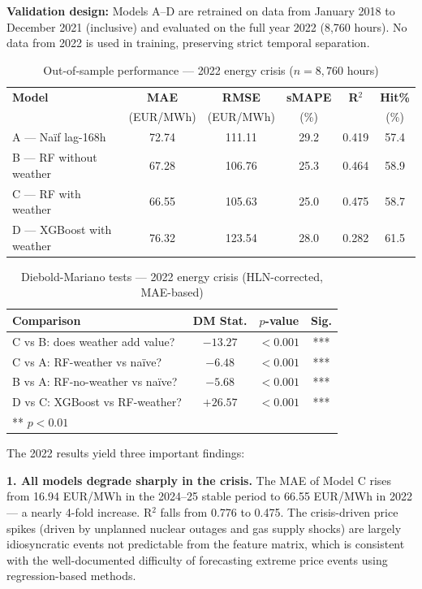 \textbf{Validation design:} Models A--D are retrained on data from January 2018
to December 2021 (inclusive) and evaluated on the full year 2022 (8{,}760
hours). No data from 2022 is used in training, preserving strict temporal
separation.

\begin{table}[H]
  \centering
  \caption{Out-of-sample performance — 2022 energy crisis ($n = 8{,}760$ hours)}
  \label{tab:model_results_2022}
  \begin{tabular}{lccccc}
    \toprule
    \textbf{Model} & \textbf{MAE} & \textbf{RMSE} & \textbf{sMAPE}
      & \textbf{R$^2$} & \textbf{Hit\%} \\
    & (EUR/MWh) & (EUR/MWh) & (\%) & & (\%) \\
    \midrule
    A --- Na\"{i}f lag-168h        & 72.74 & 111.11 & 29.2 & 0.419 & 57.4 \\
    B --- RF without weather   & 67.28 & 106.76 & 25.3 & 0.464 & 58.9 \\
    C --- RF with weather      & 66.55 & 105.63 & 25.0 & 0.475 & 58.7 \\
    D --- XGBoost with weather & 76.32 & 123.54 & 28.0 & 0.282 & 61.5 \\
    \bottomrule
  \end{tabular}
\end{table}

\begin{table}[H]
  \centering
  \caption{Diebold-Mariano tests — 2022 energy crisis (HLN-corrected, MAE-based)}
  \label{tab:dm_2022}
  \begin{tabular}{lccc}
    \toprule
    \textbf{Comparison} & \textbf{DM Stat.} & \textbf{$p$-value} & \textbf{Sig.} \\
    \midrule
    C vs B: does weather add value?       & $-13.27$ & $<0.001$ & *** \\
    C vs A: RF-weather vs na\"{i}ve?          & $-6.48$  & $<0.001$ & *** \\
    B vs A: RF-no-weather vs na\"{i}ve?       & $-5.68$  & $<0.001$ & *** \\
    D vs C: XGBoost vs RF-weather?        & $+26.57$ & $<0.001$ & *** \\
    \bottomrule
    \multicolumn{4}{l}{\small *** $p<0.01$}
  \end{tabular}
\end{table}

The 2022 results yield three important findings:

\textbf{1. All models degrade sharply in the crisis.} The MAE of Model C
rises from 16.94 EUR/MWh in the 2024--25 stable period to 66.55 EUR/MWh
in 2022 — a nearly 4-fold increase. R$^2$ falls from 0.776 to 0.475. The
crisis-driven price spikes (driven by unplanned nuclear outages and gas supply
shocks) are largely idiosyncratic events not predictable from the feature
matrix, which is consistent with the well-documented difficulty of forecasting
extreme price events using regression-based methods.

